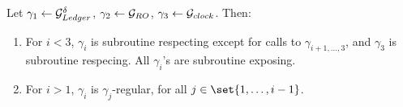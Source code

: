 \begin{lemma}
  \label{lma:gAtala}


  Let $\gamma_1 \gets \mathcal{G}_{Ledger}^\delta$, $\gamma_2 \gets \mathcal{G}_{RO}$, $\gamma_3
  \gets \mathcal{G}_{clock}$. Then:  
  
  \begin{enumerate}
  \item For $i < 3$, $\gamma_i$ is subroutine respecting except for calls to
    $\gamma_{i+1,\dots,3}$, and $\gamma_3$ is subroutine respecing. All
    $\gamma_i$'s are subroutine exposing.
  \item For $i>1$, $\gamma_i$ is $\gamma_j$-regular, for all $j \in \set{1,
      \dots,i-1}$.
  \end{enumerate}
  
\end{lemma}

